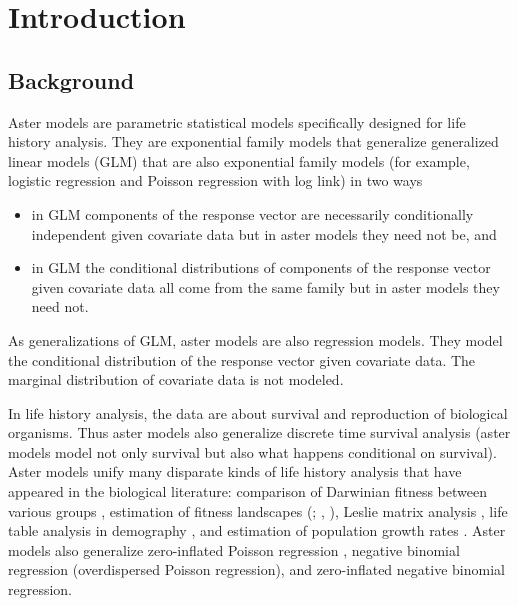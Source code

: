 
\chapter{Introduction}
\label{ch:introduction}

\section{Background}

Aster models \citep*{aster1,aster2,reaster} 
are parametric statistical models
specifically designed for life history analysis.  They are exponential family
models that generalize generalized linear models (GLM) that are also
exponential family models (for example, logistic regression and
Poisson regression with log link) in two ways
\begin{itemize}
\item in GLM components of the response vector are
    necessarily conditionally independent given covariate data
    but in aster models they need not be, and
\item in GLM the conditional distributions of components of the
    response vector given covariate data all come from the same family
    but in aster models they need not.
\end{itemize}
As generalizations of GLM, aster models are also regression models.
They model the conditional distribution of the response vector given
covariate data.  The marginal distribution of covariate data is not
modeled.

In life history analysis, 
the data are about survival and reproduction
of biological organisms.  Thus aster models also generalize discrete time
survival analysis (aster models model not only survival but also
what happens conditional on survival).
Aster models unify many disparate kinds of life history analysis that have
appeared in the biological literature: comparison of Darwinian fitness between
various groups \citep{aster1,aster2}, estimation of fitness landscapes
(\citealp{lande-arnold}; \citealp{aster2,aster3}, \citealp*{aster-hornworm}),
Leslie matrix analysis
\citep{caswell}, life table analysis in demography \citep{goodman},
and estimation of population growth rates
\citep{fisher,lenski-service,aster2,aster-hornworm}.
Aster models also generalize zero-inflated Poisson regression \citep{lambert},
negative binomial regression (overdispersed Poisson regression),
and zero-inflated negative binomial regression.


